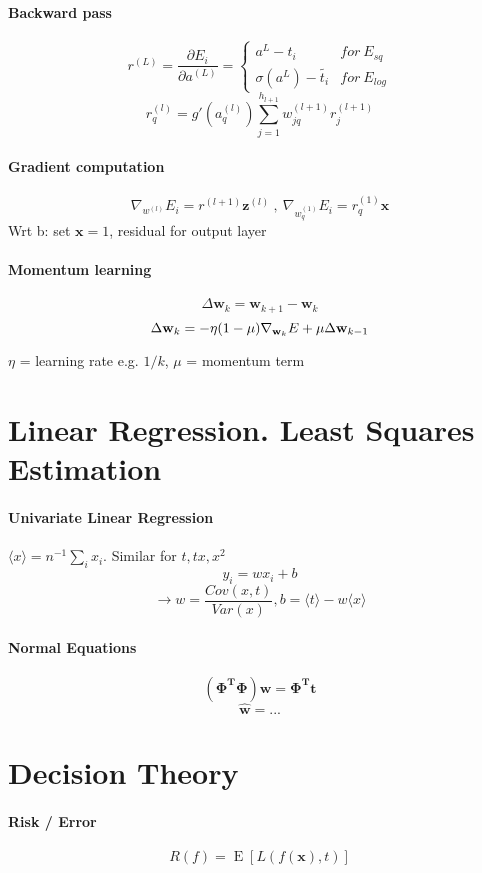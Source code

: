 \documentclass[7pt]{scrartcl}
\DeclareMathOperator{\E}{E}
\begin{document}
\begin{multicols}{4}
\paragraph{Backward pass}
\[r^{(L)}=\frac{\partial E_i}{\partial a^{(L)}} = \left\{ \begin{array}{ll}a^L - t_i & for~ E_{sq}  \\ \sigma(a^L) - \tilde{t_i} & for~ E_{log} \end{array} \right. \]
\[r_q^{(l)}=g'(a_q^{(l)})\sum_{j=1}^{h_{l+1}}w_{jq}^{(l+1)}r_j^{(l+1)}\]

\paragraph{Gradient computation}
\[\nabla_{w^{(l)}} E_i = r^{(l+1)} \mathbf{z}^{(l)} ~,~\nabla_{w_q^{(1)}} E_i = r_q^{(1)} \mathbf{x}\]
Wrt b: set $\mathbf{x} = 1$, residual for output layer

\paragraph{Momentum learning}
\[\Delta \mathbf w_k = \mathbf w_{k+1}-\mathbf w_k\]
\[\Delta \mathbf w_k = -\eta(1-\mu)\nabla_{\textbf w_k}E+\mu \Delta \mathbf w_{k-1}\]

$\eta$ = learning rate e.g. $1/k$, $\mu$ = momentum term

\section{Linear Regression. Least Squares Estimation}
\paragraph{Univariate Linear Regression}
$\langle x \rangle = n^{-1} \sum_i x_i $. Similar for $t, tx, x^2$
\[y_i = wx_i + b \]
\[\rightarrow w=\frac{Cov(x,t)}{Var(x)}, b=\langle t \rangle - w \langle x \rangle \]

\paragraph{Normal Equations}
\[ \mathbf{(\Phi^{T}\Phi) w = \Phi^{T} t}\]
\[ \hat{\mathbf{w}} = ...\]

\section{Decision Theory}
\paragraph{Risk / Error}
\[ R(f) = \E \left [ L(f(\mathbf x), t) \right ] \]


\end{multicols}
\end{document}
